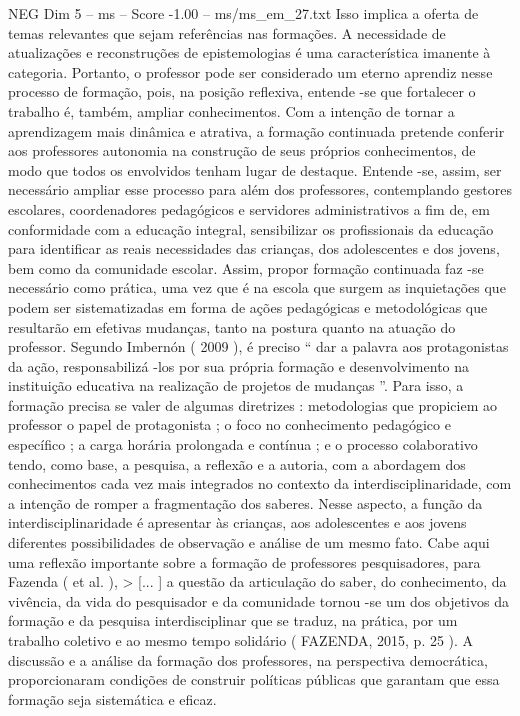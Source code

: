 \begin{textsample}{NEG Dim 5 – ms – Score -1.00 – ms/ms\_em\_27.txt}
Isso implica a oferta de temas relevantes que sejam referências nas formações.
A necessidade de atualizações e reconstruções de epistemologias é uma característica imanente à categoria.
Portanto, o professor pode ser considerado um eterno aprendiz nesse processo de formação, pois, na posição reflexiva, entende -se que fortalecer o trabalho é, também, ampliar conhecimentos.
Com a intenção de tornar a aprendizagem mais dinâmica e atrativa, a formação continuada pretende conferir aos professores autonomia na construção de seus próprios conhecimentos, de modo que todos os envolvidos tenham lugar de destaque.
Entende -se, assim, ser necessário ampliar esse processo para além dos professores, contemplando gestores escolares, coordenadores pedagógicos e servidores administrativos a fim de, em conformidade com a educação integral, sensibilizar os profissionais da educação para identificar as reais necessidades das crianças, dos adolescentes e dos jovens, bem como da comunidade escolar.
Assim, propor formação continuada faz -se necessário como prática, uma vez que é na escola que surgem as inquietações que podem ser sistematizadas em forma de ações pedagógicas e metodológicas que resultarão em efetivas mudanças, tanto na postura quanto na atuação do professor.
Segundo Imbernón ( 2009 ), é preciso “ dar a palavra aos protagonistas da ação, responsabilizá -los por sua própria formação e desenvolvimento na instituição educativa na realização de projetos de mudanças ”.
Para isso, a formação precisa se valer de algumas diretrizes : metodologias que propiciem ao professor o papel de protagonista ; o foco no conhecimento pedagógico e específico ; a carga horária prolongada e contínua ; e o processo colaborativo tendo, como base, a pesquisa, a reflexão e a autoria, com a abordagem dos conhecimentos cada vez mais integrados no contexto da interdisciplinaridade, com a intenção de romper a fragmentação dos saberes.
Nesse aspecto, a função da interdisciplinaridade é apresentar às crianças, aos adolescentes e aos jovens diferentes possibilidades de observação e análise de um mesmo fato.
Cabe aqui uma reflexão importante sobre a formação de professores pesquisadores, para Fazenda ( et al. ), > [... ] a questão da articulação do saber, do conhecimento, da vivência, da vida do pesquisador e da comunidade tornou -se um dos objetivos da formação e da pesquisa interdisciplinar que se traduz, na prática, por um trabalho coletivo e ao mesmo tempo solidário ( FAZENDA, 2015, p. 25 ).
A discussão e a análise da formação dos professores, na perspectiva democrática, proporcionaram condições de construir políticas públicas que garantam que essa formação seja sistemática e eficaz.

\end{textsample}
